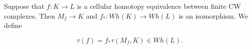 Suppose that $f: K \rightarrow L$ is a cellular homotopy equivalence between finite CW complexes. Then $M_f \rightarrow K$ and $f_*: Wh(K) \rightarrow Wh(L)$ is an isomorphism. We define

$$
\tau(f) = f_* \tau(M_f, K) \in Wh(L).
$$
